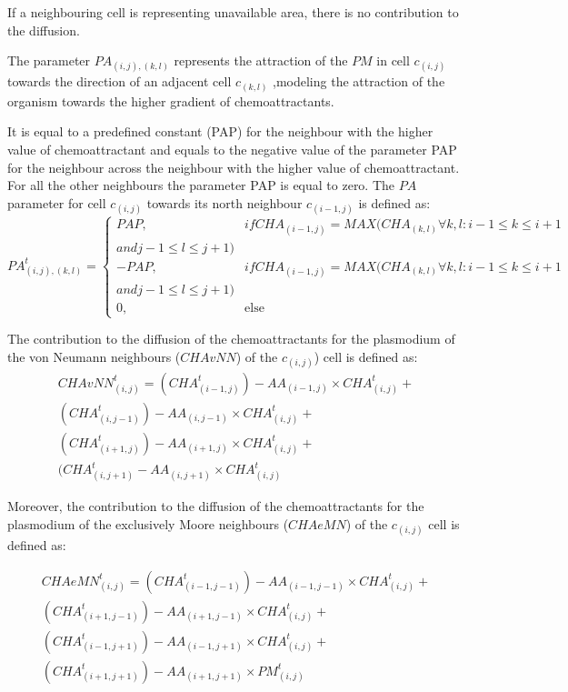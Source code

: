 If a neighbouring cell is representing unavailable area, there is no contribution to the diffusion. 
\par
The parameter $PA_{(i, j),(k,l)}$ represents the attraction of the $PM$ in cell $c_{(i,j)}$ towards the direction of an adjacent cell $c_{(k,l)}$ ,modeling the attraction of the organism towards the higher gradient of chemoattractants. 
\par
It is equal to a predefined constant (PAP) for the neighbour with the higher value of chemoattractant and equals to the negative value of the parameter PAP for the neighbour across the neighbour with the higher value of chemoattractant. For all the other neighbours the parameter PAP is equal to zero. The $PA$ parameter for cell $c_{(i,j)}$ towards its north neighbour $c_{(i-1,j)}$ is defined as:
\begin{equation}
PA^t_{(i, j),(k,l)}=
\begin{cases} 
PAP, & if CHA_{(i-1, j)} = MAX(CHA_{(k, l)} \forall k, l: i - 1 \leq k \leq i + 1 \\and j - 1 \leq l \leq j+1) \\ 
- PAP, & if CHA_{(i-1, j)} = MAX(CHA_{(k, l)} \forall k, l: i - 1 \leq k \leq i + 1 \\and j - 1 \leq l \leq j+1) \\ 
0, & \mbox{else}
\end{cases}
\end{equation}

\par
The contribution to the diffusion of the chemoattractants for the plasmodium of the von Neumann neighbours ($CHAvNN$) of the $c_{(i,j)}$) cell is defined as:
\begin{equation}
\begin{split}
CHAvNN^t_{(i, j)} = 
(CHA^t_{(i-1, j)}) - AA_{(i-1, j)} \times CHA^t_{(i, j)} +
\\(CHA^t_{(i, j-1)}) - AA_{(i, j-1)} \times CHA^t_{(i, j)} +
\\(CHA^t_{(i+1, j)}) - AA_{(i+1, j)} \times CHA^t_{(i, j)}  +
\\(CHA^t_{(i, j+1)} - AA_{(i, j+1)} \times CHA^t_{(i, j)}
\end{split}
\end{equation}

Moreover, the contribution to the diffusion of the chemoattractants for the plasmodium of the exclusively Moore neighbours ($CHAeMN$) of the $c_{(i,j)}$ cell is defined as:

\begin{equation}
\begin{split}
CHAeMN^t_{(i, j)} = 
(CHA^t_{(i-1, j-1)}) - AA_{(i-1, j-1)} \times CHA^t_{(i, j)} +
\\(CHA^t_{(i+1, j-1)}) - AA_{(i+1, j-1)} \times CHA^t_{(i, j)} +
\\(CHA^t_{(i-1, j+1)}) - AA_{(i-1, j+1)} \times CHA^t_{(i, j)}  +
\\(CHA^t_{(i+1, j+1)}) - AA_{(i+1, j+1)} \times PM^t_{(i, j)}
\end{split}
\end{equation}

